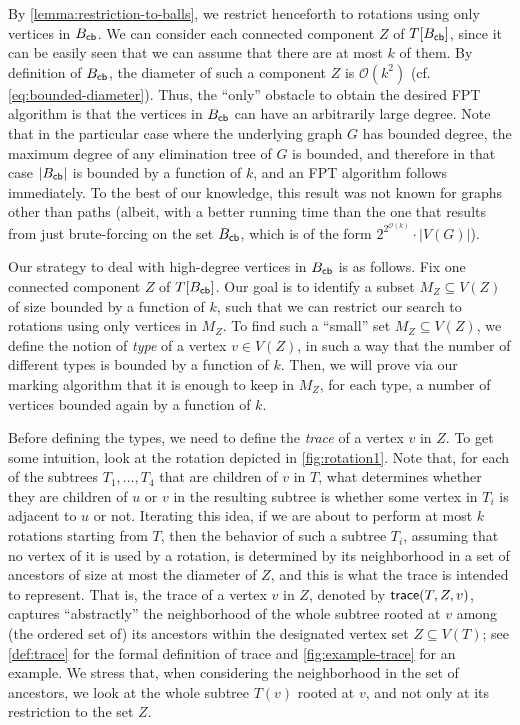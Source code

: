 \documentclass[a4paper,UKenglish,cleveref, autoref, thm-restate]{lipics-v2021}
\newcommand{\Bcb}{B_{\sf cb}\xspace}
\newcommand{\trace}{{\sf trace}\xspace}
\newcommand{\Ocal}{{\mathcal O}\xspace}
\newcommand{\FPT}{{\sf FPT}\xspace}
\begin{document}
By \autoref{lemma:restriction-to-balls}, we restrict henceforth to rotations using only vertices in $\Bcb$. We can consider each connected component $Z$ of $T[\Bcb]$, since it can be easily seen that we can assume that there are at most $k$ of them. By definition of $\Bcb$, the diameter of such a component $Z$ is $\Ocal(k^2)$ (cf. \autoref{eq:bounded-diameter}). Thus, the ``only'' obstacle to obtain the desired \FPT algorithm is that the vertices in $\Bcb$ can have an arbitrarily large degree. Note that in the particular case where the underlying graph $G$ has bounded degree, the maximum degree of any elimination tree of $G$ is bounded, and therefore in that case $|\Bcb|$ is bounded by a function of $k$, and  an \FPT algorithm follows immediately. To the best of our knowledge, this result was not known for graphs other than paths (albeit, with a better running time than the one that results from just brute-forcing on the set $\Bcb$, which is of the form $2^{2^{\Ocal(k)}} \cdot |V(G)|$).


Our strategy to deal with high-degree vertices in $\Bcb$ is as follows. Fix one connected component $Z$ of $T[\Bcb]$. Our goal is to identify a subset $M_Z \subseteq V(Z)$ of size bounded by a function of $k$, such that we can restrict our search to rotations using only vertices in $M_Z$. To find such a ``small'' set $M_Z \subseteq V(Z)$, we define the notion of \textit{type} of a vertex $v \in V(Z)$, in such a way that the number of different types is bounded by a function of $k$.  Then, we will prove via our marking algorithm that it is enough to keep in $M_Z$, for each type, a number of vertices bounded again by a function of $k$. 

Before defining the types, we need to define the \textit{trace} of a vertex $v$ in $Z$. To get some intuition, look at the rotation depicted in \autoref{fig:rotation1}. Note that, for each of the subtrees $T_1,\ldots,T_4$ that are children of $v$ in $T$, what determines whether they are children of $u$ or $v$ in the resulting subtree is whether some vertex in $T_i$ is adjacent to $u$ or not. Iterating this idea, if we are about to perform at most $k$ rotations starting from $T$, then the behavior of such a subtree $T_i$, assuming that no vertex of it is used by a rotation, is determined by its neighborhood in a set of ancestors of size at most the diameter of $Z$, and this is what the trace is intended to represent. That is, the trace of a vertex $v$ in $Z$, denoted by $\trace(T,Z,v)$, captures ``abstractly'' the neighborhood of the whole subtree rooted at $v$ among (the ordered set of) its ancestors within the designated vertex set $Z \subseteq V(T)$; see \autoref{def:trace} for the formal definition of trace and \autoref{fig:example-trace} for an example. We stress that, when considering the neighborhood in the set of ancestors,  we look at the whole subtree $T(v)$ rooted at $v$, and not only at its restriction to the set $Z$.
\end{document}
